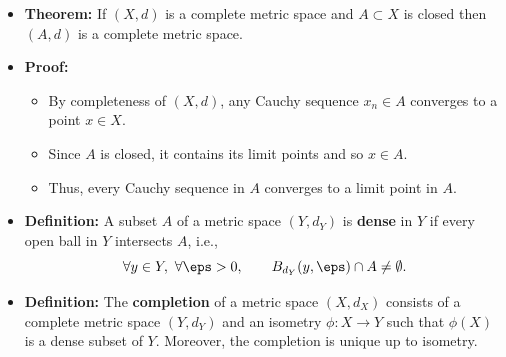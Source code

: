 \documentclass[11pt,twoside]{report}
\begin{document}
\begin{itemize}
\begin{itemize}
\begin{itemize}
YES -- For all $x \in [0,1)$ we have $f_n(x) \to 0$ and also $f_n(0) = 1$ for all $n$. 

\item Does $f_n$ converge to limit $f$ is that is also continuous?\\\

NO! Here, we see that the sequence $f_n$ is continuous but \emph{not} uniformly continuous. 
\end{itemize}



\end{itemize}



\section{Completeness and Contraction} 

\subsection{Completeness (Part 2)}

\item \textbf{Theorem:} If $(X,d)$ is a complete metric space and $A \subset X$ is closed  then $(A, d)$ is a complete metric space. 

\item \textbf{Proof:}
\begin{itemize}

\item By completeness of $(X,d)$, any Cauchy sequence  $x_n \in A$ converges to a point $x \in X$. 
\item Since $A$ is closed, it contains its limit points and so $x \in A$. 
\item Thus, every Cauchy sequence in $A$ converges to a limit point in $A$. 
\end{itemize}



\item \textbf{Definition:} A subset $A$ of a metric space $(Y,d_Y)$ is \textbf{dense} in $Y$ if every open ball in $Y$ intersects $A$, i.e.,
\[
\forall y \in Y,\ \forall \eps>0, \qquad B_{d_Y}(y,\eps) \cap A \ne \emptyset.
\]

\item \textbf{Definition:} 
The \textbf{completion} of a metric space $(X,d_X)$ consists of a complete metric space $(Y,d_Y)$ and an isometry $\phi  \colon X \rightarrow Y$ such that $\phi(X)$ is a dense subset of $Y$.
Moreover, the completion is unique up to isometry.



\end{itemize}
\end{document}
